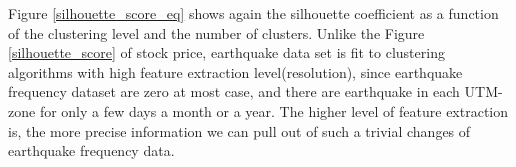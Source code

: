 \documentclass{article}
\begin{document}
Figure \ref{silhouette_score_eq} shows again the silhouette coefficient as a function of the clustering level and the number of clusters. Unlike the Figure \ref{silhouette_score} of stock price, earthquake data set is fit to clustering algorithms with high feature extraction level(resolution), since earthquake frequency dataset are zero at most case, and there are earthquake in each UTM-zone for only a few days a month or a year. The higher level of feature extraction is, the more precise information we can pull out of such a trivial changes of earthquake frequency data.

\begin{figure}
\begin{center}

\end{center}
\end{figure}
\end{document}
